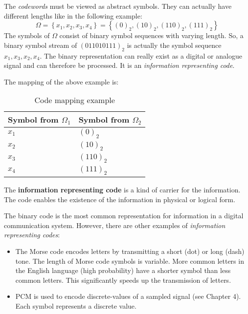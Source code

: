 \begin{refsection}
The \emph{codewords} must be viewed as abstract symbols. They can actually have different lengths like in the following example:
\begin{equation}
	\Omega = \left\{x_1, x_2, x_3, x_4\right\} = \left\{\left(0\right)_2, \left(10\right)_2, \left(110\right)_2, \left(111\right)_2\right\}
\end{equation}
The symbols of $\Omega$ consist of binary symbol sequences with varying length. So, a binary symbol stream of $\left(011010111\right)_2$ is actually the symbol sequence $x_1, x_3, x_2, x_4$. The binary representation can really exist as a digital or analogue signal and can therefore be processed. It is an \emph{information representing code}.

The mapping of the above example is:
\begin{table}[H]
	\centering
	\caption{Code mapping example}
	\begin{tabular}{|l|l|}
		\hline
		Symbol from $\Omega_1$ & Symbol from $\Omega_2$ \\
		\hline
		\hline
		$x_1$ & $\left(0\right)_2$ \\
		\hline
		$x_2$ & $\left(10\right)_2$ \\
		\hline
		$x_3$ & $\left(110\right)_2$ \\
		\hline
		$x_4$ & $\left(111\right)_2$ \\
		\hline
	\end{tabular}
\end{table}

The  \textbf{information representing code} is a kind of carrier for the information. The code enables the existence of the information in physical or logical form.

The binary code is the most common representation for information in a digital communication system. However, there are other examples of \emph{information representing codes}:
\begin{itemize}
	\item The Morse code encodes letters by transmitting a short (dot) or long (dash) tone. The length of Morse code symbols is variable. More common letters in the English language (high probability) have a shorter symbol than less common letters. This significantly speeds up the transmission of letters.
	\item \ac{PCM} is used to encode discrete-values of a sampled signal (see Chapter 4). Each symbol represents a discrete value.
\end{itemize}


\end{refsection}
